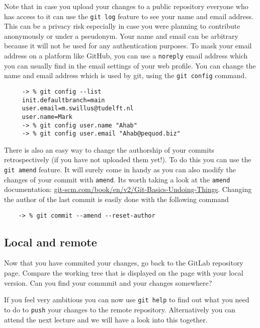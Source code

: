 \documentclass[12pt]{article}
\begin{document}
Note that in case you upload your changes to a public repository
everyone who has access to it can use the \texttt{git log} feature to see your name
and email address. This can be a privacy risk especially in case you were
planning to contribute anonymously or under a pseudonym.
Your name and email can be arbitrary because it will not be used
for any authentication purposes.
To mask your email address on a platform like GitHub,
you can use a \texttt{noreply} email address which you can usually find in the email settings
of your web profile.
You can change the name and email address which is used by git,
using the \texttt{git config} command.

    \begin{verbatim}
     -> % git config --list
     init.defaultbranch=main
     user.email=m.swillus@tudelft.nl
     user.name=Mark
     -> % git config user.name "Ahab"
     -> % git config user.email "Ahab@pequod.biz"
    \end{verbatim}

There is also an easy way to change the authorship of your commits
retrospectively (if you have not uploaded them yet!).
To do this you can use the \texttt{git amend} feature.
It will surely come in handy as you can also modify the changes of your commit
with \texttt{amend}.
Its worth taking a look at the \texttt{amend} documentation:
\href{https://git-scm.com/book/en/v2/Git-Basics-Undoing-Things}{git-scm.com/book/en/v2/Git-Basics-Undoing-Things}.
Changing the author of the last commit is easily done with the following command

    \begin{verbatim}
    -> % git commit --amend --reset-author
    \end{verbatim}


\subsection{Local and remote}
Now that you have commited your changes,
go back to the GitLab repository page.
Compare the working tree that is displayed on the page with your local version.
Can you find your commmit and your changes somewhere?

If you feel very ambitious you can now use \texttt{git help} to find out
what you need to do to \texttt{push} your changes to the remote repository.
Alternatively you can attend the next lecture and we will have a look into this together.
\end{document}
